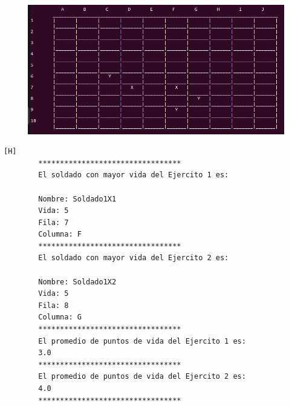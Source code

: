 \documentclass{article}
\begin{document}
	\begin{figure}[H]
		\centering
		\includegraphics[width=1.0\textwidth,keepaspectratio]{img/Commit8.png}
	\end{figure}
	\begin{lstlisting}[language=bash,caption={Ejecucion:}][H]
		*********************************
		El soldado con mayor vida del Ejercito 1 es: 
		
		Nombre: Soldado1X1
		Vida: 5
		Fila: 7
		Columna: F
		*********************************
		El soldado con mayor vida del Ejercito 2 es: 
		
		Nombre: Soldado1X2
		Vida: 5
		Fila: 8
		Columna: G
		*********************************
		El promedio de puntos de vida del Ejercito 1 es: 
		3.0
		*********************************
		El promedio de puntos de vida del Ejercito 2 es: 
		4.0
		*********************************
		
	\end{lstlisting}
\end{document}
